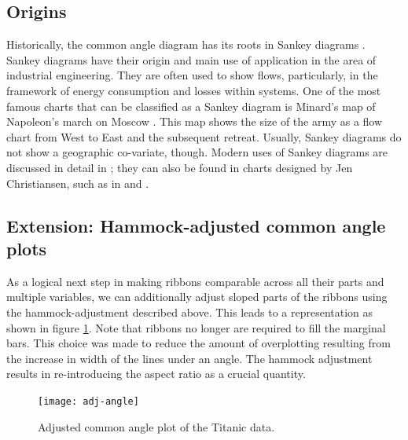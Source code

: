 \subsection{Origins}
Historically, the common angle diagram has its roots in Sankey diagrams \citep{sankey:1898}. Sankey diagrams have their origin and main use of application in the area of industrial engineering. They are often used to show flows,  particularly, in the framework of energy consumption and losses within systems.
One of the most famous charts that can be classified as a Sankey diagram is Minard's map of Napoleon's march on Moscow \citep{minard:1812}. This map  shows the size of the army as a flow chart from West to East and the subsequent retreat. Usually, Sankey diagrams do not show a geographic co-variate, though. Modern uses of Sankey diagrams are discussed in  detail in \citep{schmidt:2008};  they can also be found in charts designed by Jen Christiansen, such as in \cite{jen3} and \cite{jen2}.

%

\subsection{Extension: Hammock-adjusted common angle plots}
As a logical next step in making ribbons comparable across all their parts and multiple variables, we can additionally adjust sloped parts of the ribbons using the hammock-adjustment described above. This leads to a representation as shown in figure \ref{adj.angle}. Note that ribbons no longer are required to fill the marginal bars. This choice was made to reduce the amount of overplotting resulting from the increase in width of the lines under an angle. The hammock adjustment results in re-introducing the aspect ratio as a crucial quantity. 
\begin{figure}[hbtp]
\texttt{[image: adj-angle]}
\caption{Adjusted common angle plot of the Titanic data.}
\label{adj.angle}
\end{figure}

